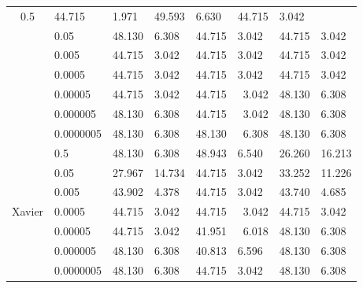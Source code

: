 \begin{table}[H]
\begin{tabular}{cl|llllll|}
    0.5 &
    44.715 &
    \multicolumn{1}{l|}{1.971} &
    49.593 &
    \multicolumn{1}{l|}{6.630} &
    44.715 &
    3.042 \\
\multicolumn{1}{|c|}{} &
    0.05 &
    48.130 &
    \multicolumn{1}{l|}{6.308} &
    44.715 &
    \multicolumn{1}{l|}{3.042} &
    44.715 &
    3.042 \\
\multicolumn{1}{|c|}{} &
    0.005 &
    44.715 &
    \multicolumn{1}{l|}{3.042} &
    44.715 &
    \multicolumn{1}{l|}{3.042} &
    44.715 &
    3.042 \\
\multicolumn{1}{|c|}{} &
    0.0005 &
    44.715 &
    \multicolumn{1}{l|}{3.042} &
    44.715 &
    \multicolumn{1}{l|}{3.042} &
    44.715 &
    3.042 \\
\multicolumn{1}{|c|}{} &
    0.00005 &
    44.715 &
    \multicolumn{1}{l|}{3.042} &
    44.715 &
    \multicolumn{1}{r|}{3.042} &
    48.130 &
    6.308 \\
\multicolumn{1}{|c|}{} &
    0.000005 &
    48.130 &
    \multicolumn{1}{l|}{6.308} &
    44.715 &
    \multicolumn{1}{r|}{3.042} &
    48.130 &
    6.308 \\
\multicolumn{1}{|c|}{} &
    0.0000005 &
    48.130 &
    \multicolumn{1}{l|}{6.308} &
    48.130 &
    \multicolumn{1}{r|}{6.308} &
    48.130 &
    6.308 \\ \hline
\multicolumn{1}{|c|}{\multirow{7}{*}{Xavier}} &
    0.5 &
    48.130 &
    \multicolumn{1}{l|}{6.308} &
    48.943 &
    \multicolumn{1}{l|}{6.540} &
    26.260 &
    \multicolumn{1}{r|}{16.213} \\
\multicolumn{1}{|c|}{} &
    0.05 &
    27.967 &
    \multicolumn{1}{l|}{14.734} &
    44.715 &
    \multicolumn{1}{l|}{3.042} &
    33.252 &
    11.226 \\
\multicolumn{1}{|c|}{} &
    0.005 &
    43.902 &
    \multicolumn{1}{l|}{4.378} &
    44.715 &
    \multicolumn{1}{l|}{3.042} &
    43.740 &
    4.685 \\
\multicolumn{1}{|c|}{} &
    0.0005 &
    44.715 &
    \multicolumn{1}{l|}{3.042} &
    44.715 &
    \multicolumn{1}{r|}{3.042} &
    44.715 &
    3.042 \\
\multicolumn{1}{|c|}{} &
    0.00005 &
    44.715 &
    \multicolumn{1}{l|}{3.042} &
    41.951 &
    \multicolumn{1}{r|}{6.018} &
    48.130 &
    6.308 \\
\multicolumn{1}{|c|}{} &
    0.000005 &
    48.130 &
    \multicolumn{1}{l|}{6.308} &
    40.813 &
    \multicolumn{1}{l|}{6.596} &
    48.130 &
    6.308 \\
\multicolumn{1}{|c|}{} &
    0.0000005 &
    48.130 &
    \multicolumn{1}{l|}{6.308} &
    44.715 &
    \multicolumn{1}{l|}{3.042} &
    48.130 &
    6.308 \\ \hline
\end{tabular}
\label{table:lenetsinhard}
\end{table}


